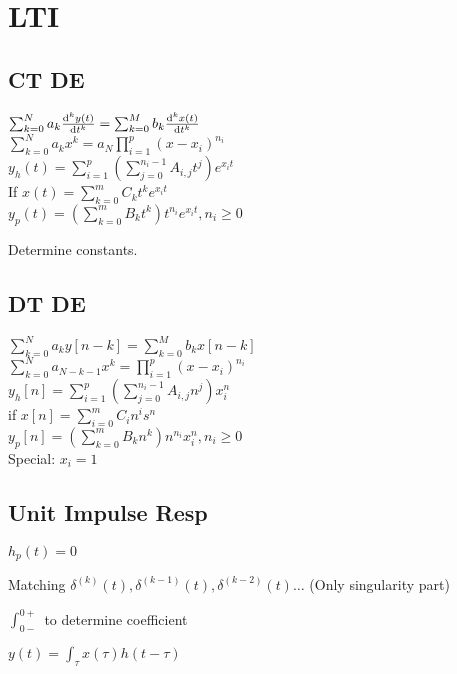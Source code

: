 \section{LTI}
\subsection*{CT DE}
$\sum_{k=0}^{N}a_k\frac{\mathrm{d}^k y(t)}{\mathrm{d} t^k}=\sum_{k=0}^{M} b_k\frac{\mathrm{d}^k x(t)}{\mathrm{d} t^k}$\\
$\sum_{k=0}^{N} a_k x^k = a_N \prod_{i=1}^p (x-x_i)^{n_i}$\\
$y_h(t) = \sum_{i=1}^{p} (\sum_{j=0}^{n_i-1} A_{i,j} t^j) e^{x_it}$\\
If $x(t)=\sum_{k=0}^{m} C_kt^ke^{x_i t}$\\
$y_p(t)=(\sum_{k=0}^{m} B_kt^k)t^{n_i} e^{x_it}, n_i\ge 0$

Determine constants.
\subsection*{DT DE}
$\sum_{k=0}^{N} a_k y[n-k] = \sum_{k=0}^{M} b_k x[n-k]$\\ 
$\sum_{k=0}^N a_{N-k-1} x^k = \prod_{i=1}^p (x-x_i)^{n_i}$\\
$y_h[n] = \sum_{i=1}^{p} (\sum_{j=0}^{n_i-1} A_{i,j} n^j) x_i^{n}$\\
if $x[n] = \sum_{i=0}^m C_i n^i s^n$\\
$y_p[n]=(\sum_{k=0}^{m} B_kn^k)n^{n_i}x_i^n , n_i\ge 0$\\
Special: $x_i=1$
\subsection*{Unit Impulse Resp}

$h_p(t) = 0$

Matching $\delta^{(k)}(t), \delta^{(k-1)}(t), \delta^{(k-2)}(t)
\ldots$ (Only singularity part)

$\int_{0-}^{0+}$ to determine coefficient

$y(t)=\int_{\tau} x(\tau)  h(t-\tau)$

